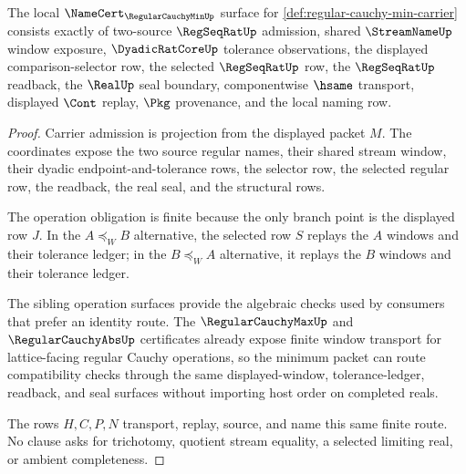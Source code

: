 \begin{theorem}
\label{thm:regular-cauchy-min-namecert-obligations}
The local $\NameCert_{\RegularCauchyMinUp}$ surface for \autoref{def:regular-cauchy-min-carrier} consists exactly of two-source $\RegSeqRatUp$ admission, shared $\StreamNameUp$ window exposure, $\DyadicRatCoreUp$ tolerance observations, the displayed comparison-selector row, the selected $\RegSeqRatUp$ row, the $\RegSeqRatUp$ readback, the $\RealUp$ seal boundary, componentwise $\hsame$ transport, displayed $\Cont$ replay, $\Pkg$ provenance, and the local naming row.
\end{theorem}
\begin{proof}
Carrier admission is projection from the displayed packet $M$. The coordinates expose the two source regular names, their shared stream window, their dyadic endpoint-and-tolerance rows, the selector row, the selected regular row, the readback, the real seal, and the structural rows.

The operation obligation is finite because the only branch point is the displayed row $J$. In the $A \preceq_W B$ alternative, the selected row $S$ replays the $A$ windows and their tolerance ledger; in the $B \preceq_W A$ alternative, it replays the $B$ windows and their tolerance ledger.

The sibling operation surfaces provide the algebraic checks used by consumers that prefer an identity route. The $\RegularCauchyMaxUp$ and $\RegularCauchyAbsUp$ certificates already expose finite window transport for lattice-facing regular Cauchy operations, so the minimum packet can route compatibility checks through the same displayed-window, tolerance-ledger, readback, and seal surfaces without importing host order on completed reals.

The rows $H,C,P,N$ transport, replay, source, and name this same finite route. No clause asks for trichotomy, quotient stream equality, a selected limiting real, or ambient completeness.
\end{proof}

